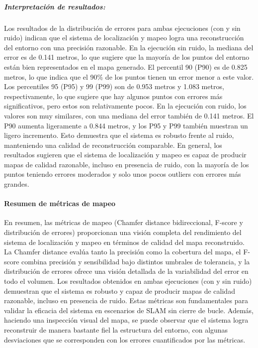 \documentclass[12pt, a4paper, twoside]{article}
\begin{document}
\subparagraph{Interpretación de resultados:}
Los resultados de la distribución de errores para ambas ejecuciones (con y sin ruido) indican que el sistema de localización y mapeo logra una reconstrucción del entorno con una precisión razonable.
En la ejecución sin ruido, la mediana del error es de 0.141 metros, lo que sugiere que la mayoría de los puntos del entorno están bien representados en el mapa generado.
El percentil 90 (P90) es de 0.825 metros, lo que indica que el 90\% de los puntos tienen un error menor a este valor.
Los percentiles 95 (P95) y 99 (P99) son de 0.953 metros y 1.083 metros, respectivamente, lo que sugiere que hay algunos puntos con errores más significativos, pero estos son relativamente pocos.
En la ejecución con ruido, los valores son muy similares, con una mediana del error también de 0.141 metros.
El P90 aumenta ligeramente a 0.844 metros, y los P95 y P99 también muestran un ligero incremento.
Esto demuestra que el sistema es robusto frente al ruido, manteniendo una calidad de reconstrucción comparable.
En general, los resultados sugieren que el sistema de localización y mapeo es capaz de producir mapas de calidad razonable, incluso en presencia de ruido, con la mayoría de los puntos teniendo errores moderados 
y solo unos pocos outliers con errores más grandes.

\paragraph{Resumen de métricas de mapeo}
En resumen, las métricas de mapeo (Chamfer\cite{Fan2020Chamfer} distance bidireccional, F-score\cite{Caccia2018FScore} y distribución de errores) proporcionan una visión completa del rendimiento del sistema de localización y mapeo en términos de calidad del mapa reconstruido.
La Chamfer\cite{Fan2020Chamfer} distance evalúa tanto la precisión como la cobertura del mapa, el F-score\cite{Caccia2018FScore} combina precisión y sensibilidad bajo distintos umbrales de tolerancia, y la distribución de errores ofrece una visión detallada de la variabilidad del error en todo el volumen.
Los resultados obtenidos en ambas ejecuciones (con y sin ruido) demuestran que el sistema es robusto y capaz de producir mapas de calidad razonable, incluso en presencia de ruido.
Estas métricas son fundamentales para validar la eficacia del sistema en escenarios de SLAM\cite{smith1987slam} sin cierre de bucle. Además, haciendo una inspección visual del mapa, se puede observar que el sistema logra reconstruir de manera bastante fiel la estructura del entorno,
con algunas desviaciones que se corresponden con los errores cuantificados por las métricas.
\end{document}

